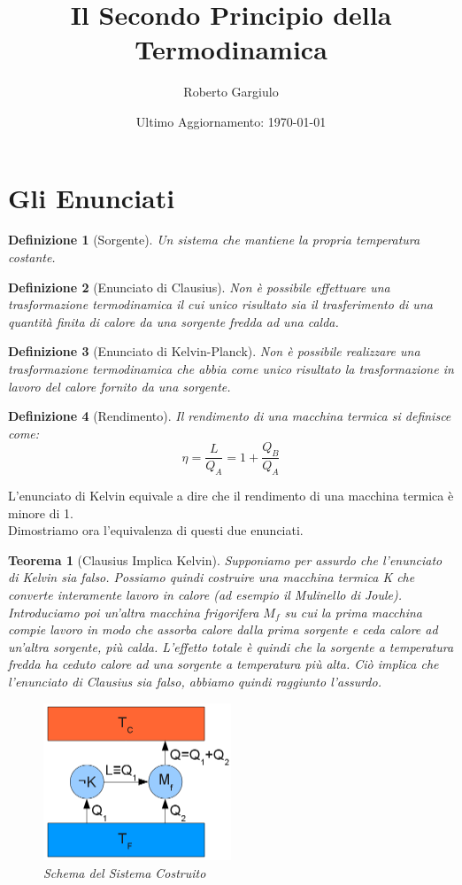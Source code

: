 \documentclass{article}
\title{Il Secondo Principio della Termodinamica}
\author{Roberto Gargiulo}
\date{Ultimo Aggiornamento: \today}
\newtheorem{thm}{Teorema}[section]
\newtheorem{defn}{Definizione}[section]
\newcommand{\note}{\noindent {\quad \bf \underline{Osservazione:}} \quad}
\begin{document}
\maketitle
\tableofcontents

\section{Gli Enunciati}
\begin{defn}[Sorgente]
Un sistema che mantiene la propria temperatura costante.
\end{defn}
\begin{defn}[Enunciato di Clausius]
Non è possibile effettuare una trasformazione termodinamica il cui unico risultato sia il trasferimento di una quantità finita di calore da una sorgente fredda ad una calda.
\end{defn}
\begin{defn}[Enunciato di Kelvin-Planck]
Non è possibile realizzare una trasformazione termodinamica che abbia come unico risultato la trasformazione in lavoro del calore fornito da una sorgente.
\end{defn}
\begin{defn}[Rendimento]
Il rendimento di una macchina termica si definisce come:
\[\eta=\frac{L}{Q_A}=1+\frac{Q_B}{Q_A}\]
\end{defn}
\note L'enunciato di Kelvin equivale a dire che il rendimento di una macchina termica è minore di 1.\\
Dimostriamo ora l'equivalenza di questi due enunciati.
\begin{thm}[Clausius Implica Kelvin]
Supponiamo per assurdo che l'enunciato di Kelvin sia falso. Possiamo quindi costruire una macchina termica K che converte interamente lavoro in calore (ad esempio il Mulinello di Joule). Introduciamo poi un'altra macchina frigorifera $M_f$ su cui la prima macchina compie lavoro in modo che assorba calore dalla prima sorgente e ceda calore ad un'altra sorgente, più calda. L'effetto totale è quindi che la sorgente a temperatura fredda ha ceduto calore ad una sorgente a temperatura più alta. Ciò implica che l'enunciato di Clausius sia falso, abbiamo quindi raggiunto l'assurdo.
\begin{figure}[H]
    \centering
    \includegraphics[width=0.5\textwidth]{Kelvin_dimostrazione_assurdo.png}
    \caption{Schema del Sistema Costruito}
    \label{ClausiusKelvin}
\end{figure}
\end{thm}
\end{document}
